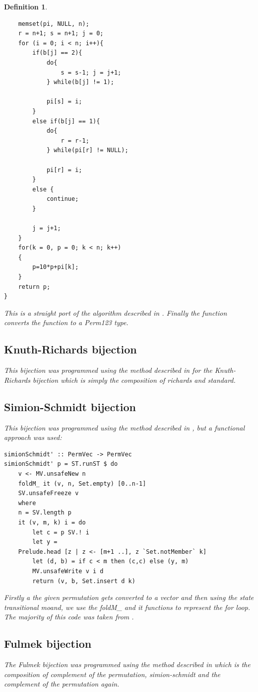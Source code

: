 \documentclass[12pt]{article}
\newtheorem{definition}{Definition}
\begin{document}
\begin{definition}
\begin{lstlisting}
	memset(pi, NULL, n);
	r = n+1; s = n+1; j = 0;
	for (i = 0; i < n; i++){
		if(b[j] == 2){
			do{
				s = s-1; j = j+1;
			} while(b[j] != 1);
			
			pi[s] = i;
		}
		else if(b[j] == 1){
			do{		
				r = r-1;
			} while(pi[r] != NULL);
			
			pi[r] = i;
		}
		else {
			continue;
		}
		
		j = j+1;
	}	
	for(k = 0, p = 0; k < n; k++) 
	{	
		p=10*p+pi[k];
	}		
	return p;
}

\end{lstlisting}
This is a straight port of the algorithm described in \cite{Clae01}. Finally the function converts the function to a Perm123 type.

\subsection{Knuth-Richards bijection}
This bijection was programmed using the method described in \cite{Clae01} for the Knuth-Richards bijection which is simply the composition of richards and standard.

\subsection{Simion-Schmidt bijection}
This bijection was programmed using the method described in \cite{Clae01}, but a functional approach was used:
\begin{lstlisting}
simionSchmidt' :: PermVec -> PermVec
simionSchmidt' p = ST.runST $ do
	v <- MV.unsafeNew n
	foldM_ it (v, n, Set.empty) [0..n-1]
	SV.unsafeFreeze v
	where
	n = SV.length p
	it (v, m, k) i = do
		let c = p SV.! i
		let y = 
	Prelude.head [z | z <- [m+1 ..], z `Set.notMember` k]
		let (d, b) = if c < m then (c,c) else (y, m)
		MV.unsafeWrite v i d
		return (v, b, Set.insert d k)
\end{lstlisting}
Firstly a the given permutation gets converted to a vector and then using the state transitional moand, we use the foldM\_ and it functions to represent the for loop. The majority of this code was taken from \cite{ClaessonSym}.

\subsection{Fulmek bijection}
The Fulmek bijection was programmed using the method described in \cite{Clae01} which is the composition of complement of the permutation, simion-schmidt and the complement of the permutation again.


\end{definition}
\end{document}

